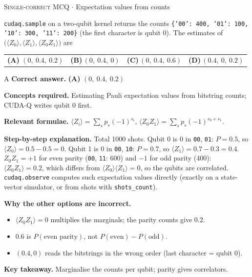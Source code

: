 \documentclass[11pt,a4paper]{article}
\newcommand{\optlabel}[1]{\textbf{(#1)}}
\newcommand{\correctlabel}[1]{\textcolor{okgreen}{\textbf{(#1)}\,\ding{51}}}
\newenvironment{qitem}[1]{\begin{list}{}{\setlength{\leftmargin}{3.3em}\setlength{\labelwidth}{3.1em}%
  \setlength{\labelsep}{0.2em}\setlength{\topsep}{3pt}\setlength{\parsep}{3pt}}\item[\textbf{Q.#1}\hfill]}{\end{list}}
\newcommand{\qsep}{\par\vspace{2pt}{\color{black!15}\hrule}\vspace{4pt}}
\newcommand{\qmeta}[2]{{\footnotesize\color{black!60}\textsc{#1} \;$\cdot$\; #2}\par}
\begin{document}
\begin{qitem}{67}
\qmeta{Single-correct MCQ}{Expectation values from counts}
\texttt{cudaq.sample} on a two-qubit kernel returns the counts \texttt{\{'00': 400, '01': 100, '10': 300, '11': 200\}}
(the first character is qubit 0). The estimates of $\big(\langle Z_0\rangle, \langle Z_1\rangle, \langle Z_0Z_1\rangle\big)$ are
\par\smallskip\noindent\begin{tabularx}{\linewidth}{@{}*{4}{L}@{}}
\correctlabel{A}\,$(0,\ 0.4,\ 0.2)$ & \optlabel{B}\,$(0,\ 0.4,\ 0)$ & \optlabel{C}\,$(0,\ 0.4,\ 0.6)$ & \optlabel{D}\,$(0.4,\ 0,\ 0.2)$
\end{tabularx}
\end{qitem}
\begin{solbox}{A}
\textbf{\color{brand}Correct answer.} \textcolor{okgreen}{\textbf{(A)}} $(0,\ 0.4,\ 0.2)$

\textbf{\color{brand}Concepts required.} Estimating Pauli expectation values from bitstring counts; CUDA-Q writes qubit 0 first.

\textbf{\color{brand}Relevant formulae.} $\langle Z_i\rangle = \sum_sp_s(-1)^{s_i}$, $\langle Z_0Z_1\rangle = \sum_sp_s(-1)^{s_0 + s_1}$.

\textbf{\color{brand}Step-by-step explanation.} Total 1000 shots. Qubit 0 is $0$ in \texttt{00}, \texttt{01}: $P = 0.5$, so $\langle Z_0\rangle = 0.5 - 0.5 = 0$.
Qubit 1 is $0$ in \texttt{00}, \texttt{10}: $P = 0.7$, so $\langle Z_1\rangle = 0.7 - 0.3 = 0.4$.
$Z_0Z_1 = +1$ for even parity (\texttt{00}, \texttt{11}: 600) and $-1$ for odd parity (400): $\langle Z_0Z_1\rangle = 0.2$, which differs from
$\langle Z_0\rangle\langle Z_1\rangle = 0$, so the qubits are correlated. \texttt{cudaq.observe} computes such expectation values directly
(exactly on a state-vector simulator, or from shots with \texttt{shots\_count}).

\textbf{\color{brand}Why the other options are incorrect.}
\begin{itemize}[leftmargin=2.4em, itemsep=1pt, topsep=2pt]
\item[\textbf{(B)}] $\langle Z_0Z_1\rangle = 0$ multiplies the marginals; the parity counts give $0.2$.
\item[\textbf{(C)}] $0.6$ is $P(\text{even parity})$, not $P(\text{even}) - P(\text{odd})$.
\item[\textbf{(D)}] $(0.4, 0)$ reads the bitstrings in the wrong order (last character = qubit 0).
\end{itemize}
\textbf{\color{brand}Key takeaway.} Marginalise the counts per qubit; parity gives correlators.
\end{solbox}
\qsep
\end{document}
